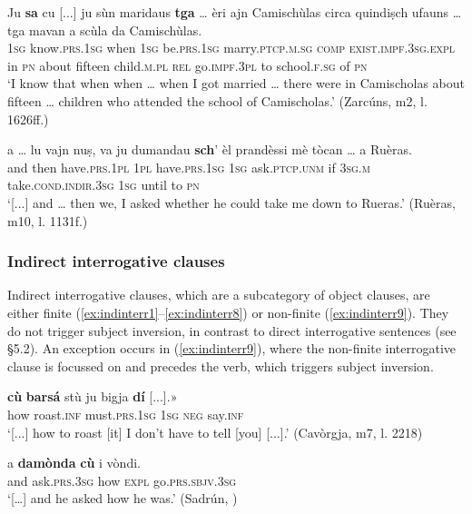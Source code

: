 \ea
\label{ex:sacutga}
\gll    Ju \textbf{sa} cu [...] ju sùn maridaus \textbf{tga} … èri ajn Camischùlas circa quindiṣch ufauns … tga mavan a scùla da Camischùlas.\\
\textsc{1sg} know.\textsc{prs.1sg} when {}  \textsc{1sg} be.\textsc{prs.1sg}  marry.\textsc{ptcp.m.sg} \textsc{comp} {} \textsc{exist.impf.3sg.expl} in \textsc{pn} about fifteen child.\textsc{m.pl} {} \textsc{rel} go.\textsc{impf.3pl} to school.\textsc{f.sg} of  \textsc{pn}\\
\glt `I know that when when … when I got married … there were in Camischolas about fifteen … children who attended the school of Camischolas.' (Zarcúns, m2, l. 1626ff.)
\z

\ea
\label{ex:objcscha1}
\gll   [...] a … lu vajn nuṣ, va ju dumandau \textbf{sch}’ èl prandèssi mè tòcan … a Ruèras. \\
{} and {} then have.\textsc{prs.1pl} \textsc{1pl} have.\textsc{prs.1sg}  \textsc{1sg} ask.\textsc{ptcp.unm} if \textsc{3sg.m} take.\textsc{cond.indir.3sg} \textsc{1sg} until {} to  \textsc{pn}\\
\glt `[...] and … then we, I asked whether he could take me down to Rueras.' (Ruèras, m10, l. 1131f.)
\z

\subsubsection{Indirect interrogative clauses}
Indirect interrogative clauses, which are a subcategory of object clauses, are either finite (\ref{ex:indinterr1}--\ref{ex:indinterr8}) or non-finite (\ref{ex:indinterr9}). They do not trigger subject inversion, in contrast to direct interrogative sentences (see §5.2). An exception occurs in (\ref{ex:indinterr9}), where the non-finite interrogative clause is focussed on and precedes the verb, which triggers subject inversion.

\ea
\label{ex:indinterr9}
\gll [...] \textbf{cù} \textbf{barsá} stù ju bigja \textbf{dí} [...].»\\
{} how roast.\textsc{inf} must.\textsc{prs.1sg} \textsc{1sg} \textsc{neg} say.\textsc{inf}\\
\glt `[...] how to roast [it] I don't have to tell [you] [...].' (Cavòrgja, m7, l. 2218)
\z

\ea
\label{ex:indinterr1}
\gll    [...] a \textbf{damònda} \textbf{cù} i vòndi.\\
{} and ask.\textsc{prs.3sg} how \textsc{expl} go.\textsc{prs.sbjv.3sg}\\
\glt `[…] and he asked how he was.' (Sadrún, \citealt[105]{Büchli1966})
\z


